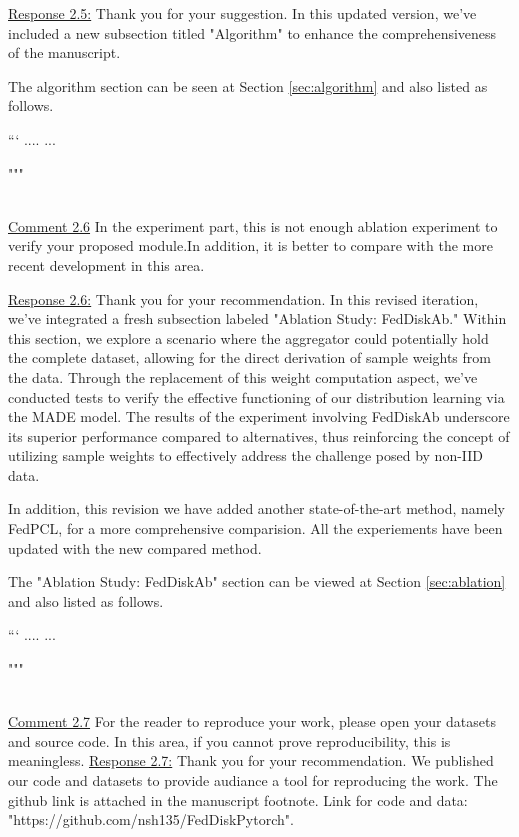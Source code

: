 \color{black}
\underline{Response 2.5:}
Thank you for your suggestion. In this updated version, we've included a new subsection titled "Algorithm" to enhance the comprehensiveness of the manuscript.

\colorbox{marygold}{The algorithm section can be seen at Section \ref{sec:algorithm} and also listed as follows.}

```
....
...

"""


~\\
\color{blue}
\underline{Comment 2.6}
In the experiment part, this is not enough ablation experiment to verify your proposed module.In addition, it is better to
compare with the more recent development in this area.

\color{black}
\underline{Response 2.6:}
Thank you for your recommendation. In this revised iteration, we've integrated a fresh subsection labeled "Ablation Study: FedDiskAb." Within this section, we explore a scenario where the aggregator could potentially hold the complete dataset, allowing for the direct derivation of sample weights from the data. Through the replacement of this weight computation aspect, we've conducted tests to verify the effective functioning of our distribution learning via the MADE model. The results of the experiment involving FedDiskAb underscore its superior performance compared to alternatives, thus reinforcing the concept of utilizing sample weights to effectively address the challenge posed by non-IID data.

In addition, this revision we have added another state-of-the-art method, namely FedPCL, for a more comprehensive comparision. All the experiements have been updated with the new compared method. 

\colorbox{marygold}{The "Ablation Study: FedDiskAb" section can be viewed at Section \ref{sec:ablation} and also listed as follows.}

```
....
...

"""

~\\
\color{blue}
\underline{Comment 2.7}
 For the reader to reproduce your work, please open your datasets and source code. In this area, if you cannot prove
reproducibility, this is meaningless.
\color{black}
\underline{Response 2.7:}
Thank you for your recommendation. We published our code and datasets to provide audiance a tool for reproducing the work. The github link is attached in the manuscript footnote. Link for code and data:\colorbox{marygold}{ "https://github.com/nsh135/FedDiskPytorch".}\\ 


